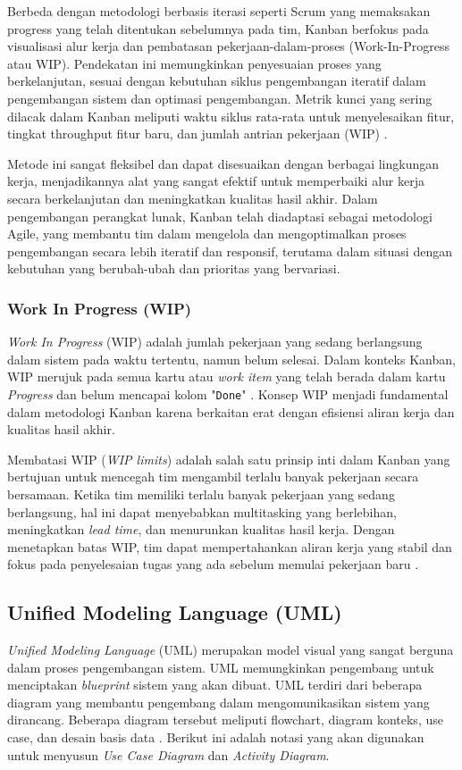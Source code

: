 Berbeda dengan metodologi berbasis iterasi seperti Scrum yang memaksakan progress yang telah ditentukan sebelumnya pada tim, Kanban berfokus pada visualisasi alur kerja dan pembatasan pekerjaan-dalam-proses (Work-In-Progress atau WIP). Pendekatan ini memungkinkan penyesuaian proses yang berkelanjutan, sesuai dengan kebutuhan siklus pengembangan iteratif dalam pengembangan sistem dan optimasi pengembangan. Metrik kunci yang sering dilacak dalam Kanban meliputi waktu siklus rata-rata untuk menyelesaikan fitur, tingkat throughput fitur baru, dan jumlah antrian pekerjaan (WIP) \cite{Alaidaros2021}.

Metode ini sangat fleksibel dan dapat disesuaikan dengan berbagai lingkungan kerja, menjadikannya alat yang sangat efektif untuk memperbaiki alur kerja secara berkelanjutan dan meningkatkan kualitas hasil akhir. Dalam pengembangan perangkat lunak, Kanban telah diadaptasi sebagai metodologi Agile, yang membantu tim dalam mengelola dan mengoptimalkan proses pengembangan secara lebih iteratif dan responsif, terutama dalam situasi dengan kebutuhan yang berubah-ubah dan prioritas yang bervariasi.

\subsubsection{Work In Progress (WIP)} \label{II.Teori6.1}
\textit{Work In Progress} (WIP) adalah jumlah pekerjaan yang sedang berlangsung dalam sistem pada waktu tertentu, namun belum selesai. Dalam konteks Kanban, WIP merujuk pada semua kartu atau \textit{work item} yang telah berada dalam kartu \textit{Progress} dan belum mencapai kolom "\texttt{Done}" \cite{Anderson2010}. Konsep WIP menjadi fundamental dalam metodologi Kanban karena berkaitan erat dengan efisiensi aliran kerja dan kualitas hasil akhir.

Membatasi WIP (\textit{WIP limits}) adalah salah satu prinsip inti dalam Kanban yang bertujuan untuk mencegah tim mengambil terlalu banyak pekerjaan secara bersamaan. Ketika tim memiliki terlalu banyak pekerjaan yang sedang berlangsung, hal ini dapat menyebabkan multitasking yang berlebihan, meningkatkan \textit{lead time}, dan menurunkan kualitas hasil kerja. Dengan menetapkan batas WIP, tim dapat mempertahankan aliran kerja yang stabil dan fokus pada penyelesaian tugas yang ada sebelum memulai pekerjaan baru \cite{Vacanti2015}.

\subsection{Unified Modeling Language (UML)}
\textit{Unified Modeling Language} (UML) merupakan model visual yang sangat
berguna dalam proses pengembangan sistem. UML memungkinkan pengembang untuk
menciptakan \textit{blueprint} sistem yang akan dibuat. UML terdiri dari
beberapa diagram yang membantu pengembang dalam mengomunikasikan sistem yang
dirancang. Beberapa diagram tersebut meliputi flowchart, diagram konteks, use
case, dan desain basis data \cite{Ozkaya2020}. Berikut ini adalah notasi yang
akan digunakan untuk menyusun \textit{Use Case Diagram} dan \textit{Activity
	Diagram}.

